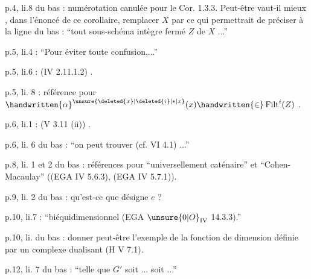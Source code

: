 p.4, li.8 du bas : numérotation canulée pour le Cor. 1.3.3. Peut-être vaut-il mieux , dans l'énoncé de ce corollaire, remplacer $X$ par  ce qui permettrait de préciser à la ligne du bas : ``tout sous-schéma intègre fermé $Z$ de $X$ ...''

p.5, li.4 : ``Pour  éviter toute confusion,...''

p.5, li.6 : (IV 2.11.1.2) .

p.5, li. 8 : référence  pour $\handwritten{\alpha}^{\unsure{\deleted{x}|\deleted{i}|*|x}}(x)\handwritten{\in}\operatorname{Filt}^{i}(Z)$ .

p.6, li.1 : (V 3.11 (ii)) .

p.6, li. 6 du bas : ``on peut trouver (cf. VI 4.1) ...''

p.8, li. 1 et 2 du bas : références pour ``universellement caténaire'' et ``Cohen-Macaulay'' ((EGA IV 5.6.3), (EGA IV 5.7.1)). 



p.9, li. 2 du bas : qu'est-ce que désigne $e$ ?

p.10, li.7 : ``biéquidimensionnel (EGA $\unsure{0|O}_{\mathrm{IV}}$ 14.3.3).''

p.10, li. du bas : donner peut-être l'exemple de la fonction de dimension définie par un complexe dualisant (\handwritten{[}H\handwritten{]} V 7.1).

p.12, li. 7 du bas : ``telle que $G'$ soit ... soit ...''

